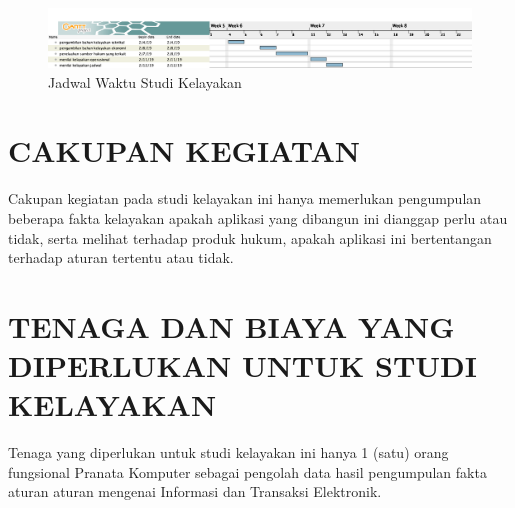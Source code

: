 \documentclass[pdftex,12pt, oneside]{article}
\begin{document}
\begin{figure}[H]
  \centering
  \includegraphics[width=1\textwidth]{./resources/gantt-jadwal-waktu}
  \caption{Jadwal Waktu Studi Kelayakan}
\end{figure}

\section{CAKUPAN KEGIATAN}

Cakupan kegiatan pada studi kelayakan ini hanya memerlukan pengumpulan beberapa fakta kelayakan apakah aplikasi yang dibangun ini dianggap perlu atau tidak, serta melihat terhadap produk hukum, apakah aplikasi ini bertentangan terhadap aturan tertentu atau tidak.

\section{TENAGA DAN BIAYA YANG DIPERLUKAN UNTUK STUDI KELAYAKAN}

Tenaga yang diperlukan untuk studi kelayakan ini hanya 1 (satu) orang fungsional Pranata Komputer sebagai pengolah data hasil pengumpulan fakta aturan aturan mengenai Informasi dan Transaksi Elektronik.
\end{document}
